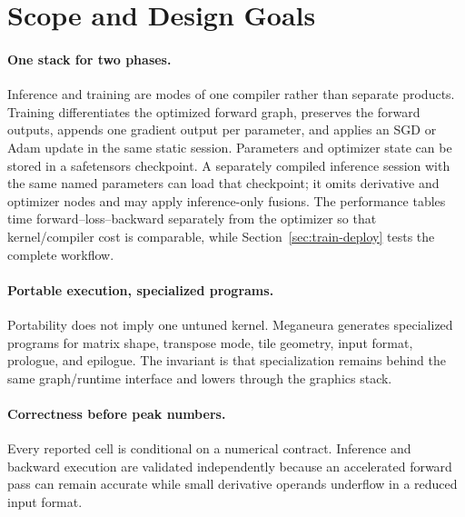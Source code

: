 \documentclass[10pt,twocolumn]{article}
\newcommand{\system}{Meganeura}
\begin{document}
\section{Scope and Design Goals}

\paragraph{One stack for two phases.}
Inference and training are modes of one compiler rather than separate
products. Training differentiates the optimized forward graph, preserves the
forward outputs, appends one gradient output per parameter, and applies an SGD
or Adam update in the same static session. Parameters and optimizer state can
be stored in a safetensors checkpoint. A separately compiled inference session
with the same named parameters can load that checkpoint; it omits derivative
and optimizer nodes and may apply inference-only fusions. The performance
tables time forward--loss--backward separately from the optimizer so that
kernel/compiler cost is comparable, while Section~\ref{sec:train-deploy}
tests the complete workflow.

\paragraph{Portable execution, specialized programs.}
Portability does not imply one untuned kernel. \system{} generates specialized
programs for matrix shape, transpose mode, tile geometry, input format,
prologue, and epilogue. The invariant is that specialization remains behind
the same graph/runtime interface and lowers through the graphics stack.

\paragraph{Correctness before peak numbers.}
Every reported cell is conditional on a numerical contract. Inference and
backward execution are validated independently because an accelerated forward
pass can remain accurate while small derivative operands underflow in a
reduced input format.
\end{document}
